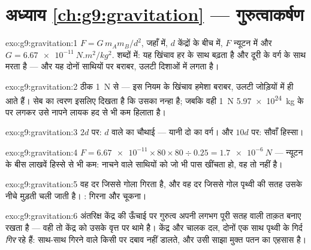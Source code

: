 \section*{अध्याय \ref{ch:g9:gravitation} --- गुरुत्वाकर्षण}

\begin{solution}{exo:g9:gravitation:1}
$F = G \, m_A m_B / d^2$, जहाँ   में, $d$ केंद्रों
के बीच  में, $F$ न्यूटन में और
$G = \qty{6.67e-11}{N.m^2/kg^2}$. शब्दों में: यह खिंचाव हर 
के साथ बढ़ता है और दूरी के वर्ग के साथ मरता है --- और यह दोनों साथियों
पर बराबर, उलटी दिशाओं में लगता है।
\end{solution}

\begin{solution}{exo:g9:gravitation:2}
ठीक \qty{1}{N} से --- इस नियम के खिंचाव हमेशा बराबर, उलटी जोड़ियों में
ही आते हैं। सेब का त्वरण इसलिए दिखता है कि उसका  नन्हा है;
जबकि वही \qty{1}{N} \qty{5.97e24}{kg} के  पर लगकर उसे नापने लायक
हद से भी कम हिलाता है।
\end{solution}

\begin{solution}{exo:g9:gravitation:3}
$2d$ पर: $d$ वाले  का चौथाई --- यानी दो का वर्ग। और $10d$ पर:
सौवाँ हिस्सा।
\end{solution}

\begin{solution}{exo:g9:gravitation:4}
$F = \num{6.67e-11} \times 80 \times 80 \div 0.25 =
\qty{1.7e-6}{N}$ --- न्यूटन के बीस लाखवें हिस्से से भी कम: नाचने
वाले साथियों को जो भी पास खींचता हो, वह  तो नहीं है।
\end{solution}

\begin{solution}{exo:g9:gravitation:5}
वह दर जिससे गोला गिरता है, और वह दर जिससे गोल पृथ्वी की सतह उसके नीचे
मुड़ती चली जाती है। : गिरना और चूकना।
\end{solution}

\begin{solution}{exo:g9:gravitation:6}
अंतरिक्ष केंद्र की ऊँचाई पर गुरुत्व अपनी लगभग पूरी सतह वाली ताक़त बनाए
रखता है --- वही तो केंद्र को उसके वृत्त पर थामे है। केंद्र और चालक दल,
दोनों एक साथ पृथ्वी के गिर्द \emph{गिर} रहे हैं: साथ-साथ गिरने वाले
किसी पर दबाव नहीं डालते, और  उसी साझा मुक्त पतन का एहसास है।
\end{solution}


